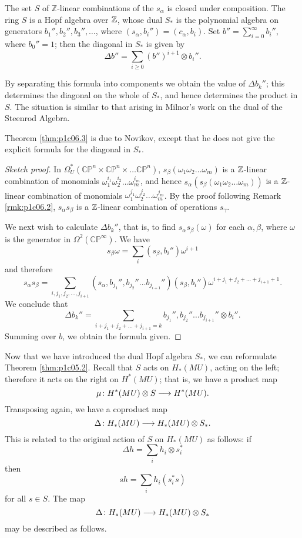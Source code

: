 \documentclass[../main]{subfiles}
\begin{document}
\begin{theorem}\label{thm:p1c06.3}
The set $S$ of $\mathbb{Z}$-linear combinations of the $s_\alpha$ is closed under composition. The ring $S$ is a Hopf algebra over $\mathbb{Z}$, whose dual $S_*$ is the polynomial algebra on generators $b_1'',b_2'',b_3'',\dots$, where $(s_\alpha,b_i'') = (c_\alpha,b_i)$. Set $b'' = \sum_{i=0}^\infty b_i''$, where $b_0'' = 1$; then the diagonal in $S_*$ is given by 
\[\Delta b'' = \sum_{i \geq 0} (b'')^{i+1} \otimes b_i ''.\]
\end{theorem}
\begin{explanation}
By separating this formula into components we obtain the value of $\Delta b_k''$; this determines the diagonal on the whole of $S_*$, and hence determines the product in $S$. The situation is similar to that arising in Milnor's work on the dual of the Steenrod Algebra.
\end{explanation}
Theorem \ref{thm:p1c06.3} is due to Novikov, except that he does not give the explicit formula for the diagonal in $S_*$.
\begin{proof}[Sketch proof]
In $\Omega_U^*(\mathbb{CP}^n \times \mathbb{CP}^n \times \dots \mathbb{CP}^n)$, $s_\beta(\omega_1 \omega_2 \dots \omega_m)$ is a $\mathbb{Z}$-linear combination of monomials $\omega_1^{i_1} \omega_2^{i_2} \dots \omega_m^{i_m}$, and hence $s_\alpha(s_\beta(\omega_1 \omega_2 \dots \omega_m))$ is a $\mathbb{Z}$-linear combination of monomials  $\omega_1^{j_1} \omega_2^{j_2} \dots \omega_m^{j_m}$. By the proof following Remark \ref{rmk:p1c06.2}, $s_\alpha s_\beta$ is a $\mathbb{Z}$-linear combination of operations $s_\gamma$.

We next wish to calculate $\Delta b_k''$, that is, to find $s_\alpha s_\beta(\omega)$ for each $\alpha,\beta$, where $\omega$ is the generator in $\Omega^2(\mathbb{CP}^\infty)$. We have
\[s_\beta \omega = \sum_i (s_\beta , b_i'')\omega^{i+1}\]
and therefore
\[s_\alpha s_\beta = \sum_{i,j_1,j_2,\dots,j_{i+1}} (s_\alpha, b_{j_1}'',b_{j_2}'' \dots b_{j_{i+1}}'')(s_\beta,b_i'') \omega^{i + j_1 + j_2 + \dots + j_{i+1}+1}.\]
We conclude that
\[\Delta b_k'' = \sum_{i + j_1 + j_2 + \dots + j_{i+1} = k}b_{j_1}'',b_{j_2}'' \dots b_{j_{i+1}}'' \otimes b_i''.\]
Summing over $b$, we obtain the formula given.
\end{proof}
\begin{note}
Now that we have introduced the dual Hopf algebra $S_*$, we can reformulate Theorem \ref{thm:p1c05.2}. Recall that $S$ acts on $H_*(MU)$, acting on the left; therefore it acts on the right on $H^*(MU)$; that is, we have a product map
\[\mu\colon H^*(MU) \otimes S \longrightarrow H^*(MU).\]
Transposing again, we have a coproduct map
\[\Delta\colon H_*(MU) \longrightarrow H_*(MU) \otimes S_*.\]
This is related to the original action of $S$ on $H_*(MU)$ as follows: if
\[\Delta h = \sum_i h_i \otimes s_i^*\]
then
\[sh = \sum_i h_i(s_i^* s)\]
for all $s \in S$. The map
\[\Delta \colon H_*(MU) \longrightarrow H_*(MU) \otimes S_*\]
may be described as follows.
\end{note}
\end{document}
